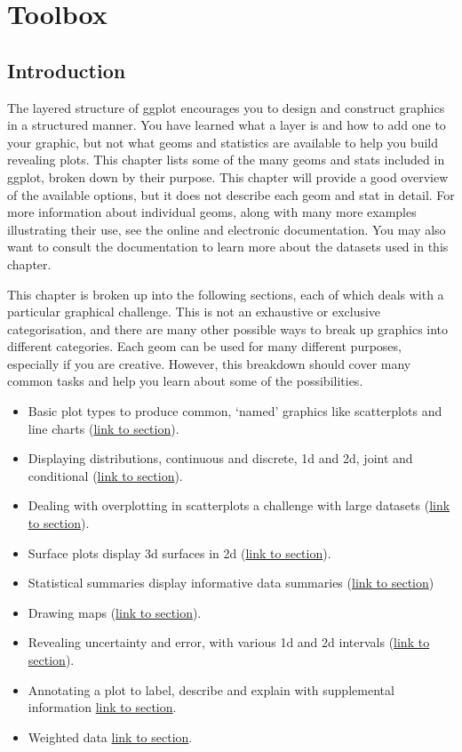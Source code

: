 \chapter{Toolbox}\label{cha:toolbox}

\section{Introduction}

The layered structure of ggplot encourages you to design and construct
graphics in a structured manner. You have learned what a layer is and
how to add one to your graphic, but not what geoms and statistics are
available to help you build revealing plots. This chapter lists some of
the many geoms and stats included in ggplot, broken down by their
purpose. This chapter will provide a good overview of the available
options, but it does not describe each geom and stat in detail. For more
information about individual geoms, along with many more examples
illustrating their use, see the online and electronic documentation. You
may also want to consult the documentation to learn more about the
datasets used in this chapter.

This chapter is broken up into the following sections, each of which
deals with a particular graphical challenge. This is not an exhaustive
or exclusive categorisation, and there are many other possible ways to
break up graphics into different categories. Each geom can be used for
many different purposes, especially if you are creative. However, this
breakdown should cover many common tasks and help you learn about some
of the possibilities.

\begin{itemize}
\itemsep1pt\parskip0pt
\item
  Basic plot types to produce common, `named' graphics like scatterplots
  and line charts (\hyperref[sec:basics]{link to section}).
\item
  Displaying distributions, continuous and discrete, 1d and 2d, joint
  and conditional (\hyperref[sec:distributions]{link to section}).
\item
  Dealing with overplotting in scatterplots a challenge with large
  datasets (\hyperref[sec:overplotting]{link to section}).
\item
  Surface plots display 3d surfaces in 2d (\hyperref[sec:surface]{link
  to section}).
\item
  Statistical summaries display informative data summaries
  (\hyperref[sec:summary]{link to section})
\item
  Drawing maps (\hyperref[sec:maps]{link to section}).
\item
  Revealing uncertainty and error, with various 1d and 2d intervals
  (\hyperref[sec:uncertainty]{link to section}).
\item
  Annotating a plot to label, describe and explain with supplemental
  information \hyperref[sec:annotating]{link to section}.
\item
  Weighted data \hyperref[sec:weighting]{link to section}.
\end{itemize}

